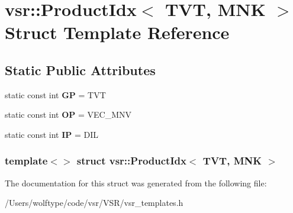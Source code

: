 \hypertarget{structvsr_1_1_product_idx_3_01_t_v_t_00_01_m_n_k_01_4}{\section{vsr\-:\-:Product\-Idx$<$ T\-V\-T, M\-N\-K $>$ Struct Template Reference}
\label{structvsr_1_1_product_idx_3_01_t_v_t_00_01_m_n_k_01_4}
}
\subsection*{Static Public Attributes}
\begin{DoxyCompactItemize}
\item 
\hypertarget{structvsr_1_1_product_idx_3_01_t_v_t_00_01_m_n_k_01_4_a7d4b2cbe1f4b7de41893817d79474cac}{static const int {\bfseries G\-P} = T\-V\-T}\label{structvsr_1_1_product_idx_3_01_t_v_t_00_01_m_n_k_01_4_a7d4b2cbe1f4b7de41893817d79474cac}

\item 
\hypertarget{structvsr_1_1_product_idx_3_01_t_v_t_00_01_m_n_k_01_4_aa78d11349acb774813a8ef980dfc341a}{static const int {\bfseries O\-P} = V\-E\-C\-\_\-\-M\-N\-V}\label{structvsr_1_1_product_idx_3_01_t_v_t_00_01_m_n_k_01_4_aa78d11349acb774813a8ef980dfc341a}

\item 
\hypertarget{structvsr_1_1_product_idx_3_01_t_v_t_00_01_m_n_k_01_4_a7976e5227ac084b811de724204fcc666}{static const int {\bfseries I\-P} = D\-I\-L}\label{structvsr_1_1_product_idx_3_01_t_v_t_00_01_m_n_k_01_4_a7976e5227ac084b811de724204fcc666}

\end{DoxyCompactItemize}
\subsubsection*{template$<$$>$ struct vsr\-::\-Product\-Idx$<$ T\-V\-T, M\-N\-K $>$}



The documentation for this struct was generated from the following file\-:\begin{DoxyCompactItemize}
\item 
/\-Users/wolftype/code/vsr/\-V\-S\-R/vsr\-\_\-templates.\-h\end{DoxyCompactItemize}
